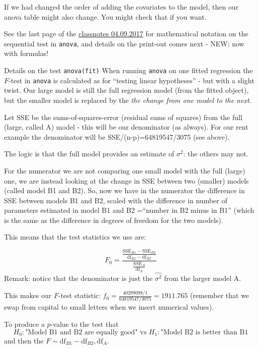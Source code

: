 \documentclass[
  ignorenonframetext,
]{beamer}
\begin{document}
\begin{frame}
If we had changed the order of adding the covariates to the model, then
our anova table might also change. You might check that if you want.
\end{frame}

\begin{frame}[fragile]
See the last page of the
\href{https://www.math.ntnu.no/emner/TMA4315/2017h/M2_Classnotes20170904.pdf}{classnotes
04.09.2017} for mathematical notation on the sequential test in
\texttt{anova}, and details on the print-out comes next - NEW: now with
formulas!
\end{frame}

\begin{frame}[fragile]
\begin{block}{Details on the test \texttt{anova(fit)}}
\label{details-on-the-test-anovafit}
When running \texttt{anova} on one fitted regression the \(F\)-test in
\texttt{anova} is calculated as for ``testing linear hypotheses'' - but
with a slight twist. Our large model is still the full regression model
(from the fitted object), but the smaller model is replaced by the
\emph{the change from one model to the next}.

Let SSE be the sums-of-squares-error (residual sums of squares) from the
full (large, called A) model - this will be our denominator (as always).
For our rent example the denominator will be SSE/(n-p)=64819547/3075
(see above).

The logic is that the full model provides an estimate of \(\sigma^2\):
the others may not.
\end{block}
\end{frame}

\begin{frame}
For the numerator we are not comparing one small model with the full
(large) one, we are instead looking at the change in SSE between two
(smaller) models (called model B1 and B2). So, now we have in the
numerator the difference in SSE between models B1 and B2, scaled with
the difference in number of parameters estimated in model B1 and B2
=``number in B2 minus in B1'' (which is the same as the difference in
degrees of freedom for the two models).
\end{frame}

\begin{frame}
This means that the test statistics we use are:

\[ F_0=\frac{\frac{\text{SSE}_{B1}-\text{SSE}_{B2}}{\text{df}_{B1}-\text{df}_{B2}}}{\frac{\text{SSE}_A}{\text{df}_A}}\]
Remark: notice that the denominator is just the \(\hat{\sigma^2}\) from
the larger model A.

This makes our \(F\)-test statistic:
\(f_0=\frac{40299098/1}{64819547/3075}=1911.765\) (remember that we swap
from capital to small letters when we insert numerical values).

To produce a \(p\)-value to the test that
\[H_0: \text{"Model B1 and B2 are equally good" vs }H_1:\text{"Model B2 is better than B1}\]
and then the \(F\sim {\text{df}_{B1}-\text{df}_{B2},\text{df}_A}\).
\end{frame}
\end{document}

